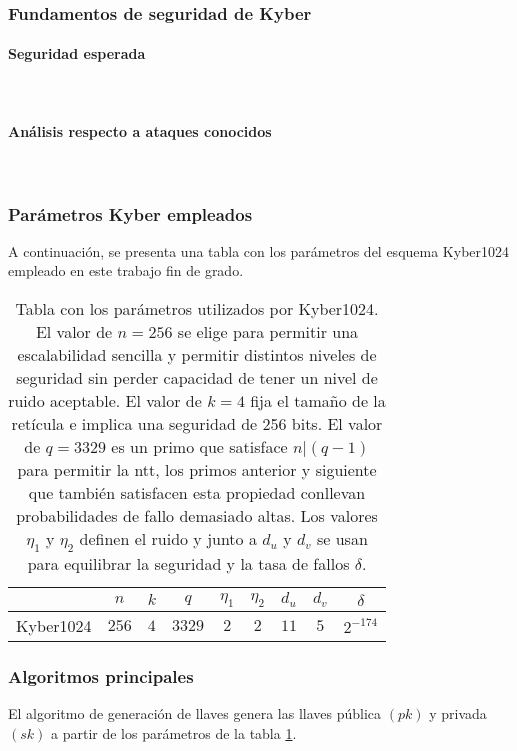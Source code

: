 \subsubsection{Fundamentos de seguridad de Kyber}
\paragraph{Seguridad esperada}
\mbox{}\\
\paragraph{Análisis respecto a ataques conocidos}
\mbox{}\\
\subsubsection{Parámetros Kyber empleados}
A continuación, se presenta una tabla con los parámetros del esquema Kyber1024 empleado en este trabajo fin de grado.
\begin{table}[h]
	\centering
	\renewcommand{\arraystretch}{1.2}
	\begin{tabular}{lcccccccc}
		\hline
		&\(n\)&\(k\)&\(q\)&\(\eta_1\)&\(\eta_2\)&\(d_u\)&\(d_v\)&\(\delta\)\\
		\hline
		Kyber1024&\(256\)&\(4\)&\(3329\)&\(2\)&\(2\)&\(11\)&\(5\)&\(2^{-174}\)\\
		\hline
	\end{tabular}
	\caption{Tabla con los parámetros utilizados por Kyber1024. El valor de \(n=256\) se elige para permitir una escalabilidad sencilla y permitir distintos niveles de seguridad sin perder capacidad de tener un nivel de ruido aceptable. El valor de \(k=4\) fija el tamaño de la retícula e implica una seguridad de 256 bits. El valor de \(q=3329\) es un primo que satisface \(n|(q-1)\) para permitir la \gls{ntt}, los primos anterior y siguiente que también satisfacen esta propiedad conllevan probabilidades de fallo demasiado altas. Los valores $\eta_1$ y $\eta_2$ definen el ruido y junto a \(d_u\) y \(d_v\) se usan para equilibrar la seguridad y la tasa de fallos $\delta$.}
	\label{tab:KyberParams}
\end{table}


\newpage

\subsubsection{Algoritmos principales \cite{kyber-spec-2021}}
\label{sub:kybAlg}
El algoritmo de generación de llaves genera las llaves pública \((pk)\) y privada \((sk)\) a partir de los parámetros de la tabla \ref{tab:KyberParams}.

